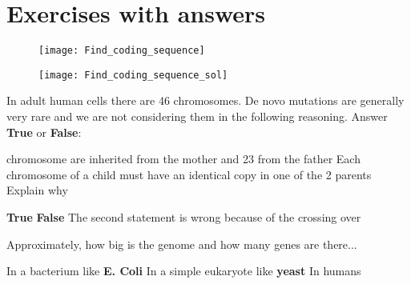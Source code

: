 \chapter{Exercises with answers}

\begin{Exercise} [
  title={Coding sequence},
  difficulty={1},
  label={excs},
  origin={G. Valle}
 ]
 
 \begin{figure}[H]
  \centering
  \texttt{[image: Find\_coding\_sequence]}
 \end{figure}

\end{Exercise}

\newpage

\begin{Answer} [
  ref={excs},
  number={1}
 ]
 
 \begin{figure}[H]
  \centering
  \texttt{[image: Find\_coding\_sequence\_sol]}
 \end{figure}

\end{Answer}



\begin{Exercise} [
  title={Chromosomes},
  difficulty={1},
  label={ex1},
  origin={G. Valle}
 ]

  In adult human cells there are 46 chromosomes. De novo mutations are generally
very rare and we are not considering them in the following reasoning.
Answer \textbf{True} or \textbf{False}:

   chromosome are inherited from the mother and 23 from the father
  \Question Each chromosome of a child must have an identical copy in one of the
2 parents
  \subQuestion Explain why
\end{Exercise}

\begin{Answer} [
   ref={ex1},
   number={1}
 ]

  \Question \textbf{True}
  \Question \textbf{False}
  \subQuestion The second statement is wrong because of the crossing over

\end{Answer}


\begin{Exercise} [
  title={Genomes and genes},
  difficulty={1},
  label={ex2},
  origin={G. Valle}
 ]

  Approximately, how big is the genome and how many genes are there...

  \Question In a bacterium like \textbf{E. Coli}
  \Question In a simple eukaryote like \textbf{yeast}
  \Question In humans

\end{Exercise}

